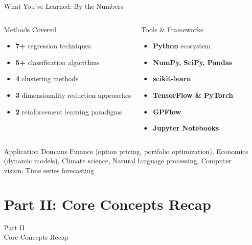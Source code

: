 \documentclass[aspectratio=169,11pt]{beamer}
\begin{document}
\begin{frame}{What You've Learned: By the Numbers}
\begin{columns}
\begin{block}{Methods Covered}
\begin{itemize}
    \item \textbf{7+} regression techniques
    \item \textbf{5+} classification algorithms
    \item \textbf{4} clustering methods
    \item \textbf{3} dimensionality reduction approaches
    \item \textbf{2} reinforcement learning paradigms
\end{itemize}
\end{block}

\begin{block}{Tools \& Frameworks}
\begin{itemize}
    \item \textbf{Python} ecosystem
    \item \textbf{NumPy, SciPy, Pandas}
    \item \textbf{scikit-learn}
    \item \textbf{TensorFlow \& PyTorch}
    \item \textbf{GPFlow}
    \item \textbf{Jupyter Notebooks}
\end{itemize}
\end{block}
\end{columns}

\vspace{1em}
\begin{block}{Application Domains}
Finance (option pricing, portfolio optimization), Economics (dynamic models), Climate science, Natural language processing, Computer vision, Time series forecasting
\end{block}
\end{frame}

\section{Part II: Core Concepts Recap}

\begin{frame}{}
\begin{center}
{\Huge \textcolor{hec-blue}{Part II}}\\[1em]
{\LARGE Core Concepts Recap}
\end{center}
\end{frame}
\end{document}
